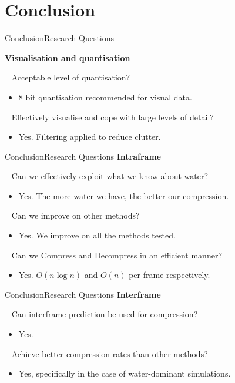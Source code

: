 \documentclass{beamer}
\begin{document}
\section{Conclusion}
\begin{frame}{Conclusion}{Research Questions}

\textbf{Visualisation and quantisation}

\ \newline
Acceptable level of quantisation?
\begin{itemize}
  \item 8 bit quantisation recommended for visual data.
\end{itemize}

\ \newline
Effectively visualise and cope with large levels of detail?
\begin{itemize}
  \item Yes. Filtering applied to reduce clutter.
\end{itemize}
\end{frame}

\begin{frame}{Conclusion}{Research Questions}
\textbf{Intraframe}

\ \newline
Can we effectively exploit what we know about water?
\begin{itemize}
  \item Yes. The more water we have, the better our compression.
\end{itemize}

\ \newline
Can we improve on other methods?
\begin{itemize}
  \item Yes. We improve on all the methods tested.
\end{itemize}

\ \newline
Can we Compress and Decompress in an efficient manner?
\begin{itemize}
  \item Yes. $O(n \log n)$ and $O(n)$ per frame respectively.
\end{itemize}
\end{frame}

\begin{frame}{Conclusion}{Research Questions}
\textbf{Interframe}

\ \newline
Can interframe prediction be used for compression?
\begin{itemize}
  \item Yes.
\end{itemize}

\ \newline
Achieve better compression rates than other methods?
\begin{itemize}
  \item Yes, specifically in the case of water-dominant simulations.
\end{itemize}
\end{frame}
\end{document}
